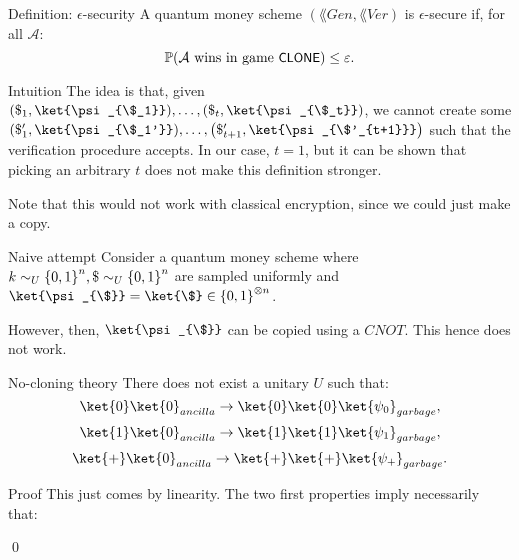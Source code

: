 \documentclass[a4paper]{article}
\begin{document}
\begin{parag}{Definition: $\epsilon$-security}
    A quantum money scheme $\left(\lang{Gen}, \lang{Ver}\right)$ is $\epsilon$-secure if, for all  $\mathcal{A}$: 
    \[\prob\left(\text{$\mathcal{A}$ wins in game \lang{CLONE}}\right) \leq \epsilon.\]

    \begin{subparag}{Intuition}
        The idea is that, given $\left(\$_1, \ket{\psi_{\$_1}}\right), \ldots, \left(\$_t, \ket{\psi_{\$_t}}\right)$, we cannot create some $\left(\$_1', \ket{\psi_{\$_1'}}\right), \ldots, \left(\$_{t+1}', \ket{\psi_{\$'_{t+1}}}\right)$ such that the verification procedure accepts. In our case, $t = 1$, but it can be shown that picking an arbitrary $t$ does not make this definition stronger.

        Note that this would not work with classical encryption, since we could just make a copy.
    \end{subparag}
\end{parag}

\begin{parag}{Naive attempt}
    Consider a quantum money scheme where $k \followsdistr_U \left\{0, 1\right\}^n, \$ \followsdistr_U \left\{0, 1\right\}^n$ are sampled uniformly and $\ket{\psi_{\$}} = \ket{\$} \in \left\{0, 1\right\}^{\otimes n}$.

    However, then, $\ket{\psi_{\$}}$ can be copied using a $CNOT$. This hence does not work.
\end{parag}

\begin{parag}{No-cloning theory}
    There does not exist a unitary $U$ such that: 
    \[\ket{0}\ket{0}_{ancilla} \to \ket{0}\ket{0} \ket{\psi_0}_{garbage},\]
    \[\ket{1}\ket{0}_{ancilla} \to \ket{1}\ket{1} \ket{\psi_1}_{garbage},\]
    \[\ket{+}\ket{0}_{ancilla} \to \ket{+}\ket{+} \ket{\psi_+}_{garbage}.\]
    
    \begin{subparag}{Proof}
        This just comes by linearity. The two first properties imply necessarily that: 

        \qed
    \end{subparag}
\end{parag}
\end{document}
